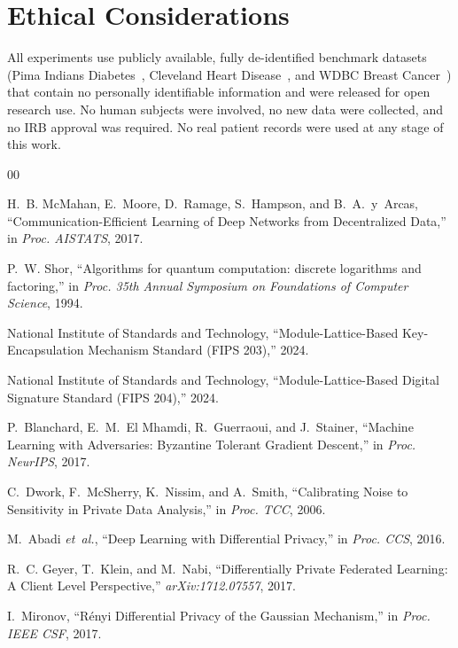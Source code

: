 \documentclass[runningheads]{llncs}
\begin{document}
\section*{Ethical Considerations}
All experiments use publicly available, fully de-identified benchmark
datasets (Pima Indians Diabetes~\cite{smith1988}, Cleveland Heart
Disease~\cite{detrano1989}, and WDBC Breast Cancer~\cite{street1993})
that contain no personally identifiable information and were released
for open research use.
No human subjects were involved, no new data were collected, and no
IRB approval was required.
No real patient records were used at any stage of this work.

\begin{thebibliography}{00}

H.~B. McMahan, E.~Moore, D.~Ramage, S.~Hampson, and B.~A.~y~Arcas,
``Communication-Efficient Learning of Deep Networks from Decentralized
Data,'' in \emph{Proc. AISTATS}, 2017.

P.~W. Shor, ``Algorithms for quantum computation: discrete logarithms
and factoring,'' in \emph{Proc. 35th Annual Symposium on Foundations
of Computer Science}, 1994.

National Institute of Standards and Technology,
``Module-Lattice-Based Key-Encapsulation Mechanism Standard (FIPS 203),''
2024.

National Institute of Standards and Technology,
``Module-Lattice-Based Digital Signature Standard (FIPS 204),''
2024.

P.~Blanchard, E.~M.~El Mhamdi, R.~Guerraoui, and J.~Stainer,
``Machine Learning with Adversaries: Byzantine Tolerant Gradient
Descent,'' in \emph{Proc. NeurIPS}, 2017.

C.~Dwork, F.~McSherry, K.~Nissim, and A.~Smith,
``Calibrating Noise to Sensitivity in Private Data Analysis,''
in \emph{Proc. TCC}, 2006.

M.~Abadi \emph{et~al.}, ``Deep Learning with Differential Privacy,''
in \emph{Proc. CCS}, 2016.

R.~C. Geyer, T.~Klein, and M.~Nabi,
``Differentially Private Federated Learning: A Client Level
Perspective,'' \emph{arXiv:1712.07557}, 2017.

I.~Mironov, ``R\'{e}nyi Differential Privacy of the Gaussian
Mechanism,'' in \emph{Proc. IEEE CSF}, 2017.


\end{thebibliography}
\end{document}
